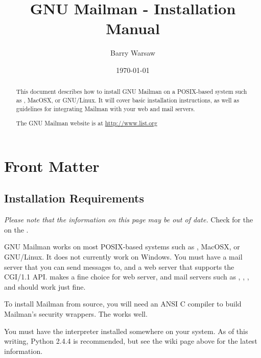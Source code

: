 \documentclass{howto}
\title{GNU Mailman - Installation Manual}
\author{Barry Warsaw}
\date{\today}
\begin{document}
\maketitle

%
\ifhtml
\chapter*{Front Matter\label{front}}
\fi

\begin{abstract}
\noindent
This document describes how to install GNU Mailman on a POSIX-based system
such as \UNIX{}, MacOSX, or GNU/Linux.  It will cover basic installation
instructions, as well as guidelines for integrating Mailman with your web and
mail servers.

\noindent
The GNU Mailman website is at \url{http://www.list.org}
\end{abstract}

%
\tableofcontents


\section{Installation Requirements}

\emph{Please note that the information on this page may be out of date.}
Check for the
 on the
.

GNU Mailman works on most POSIX-based systems such as \UNIX{}, MacOSX, or
GNU/Linux.  It does not currently work on Windows.  You must have a mail
server that you can send messages to, and a web server that supports the
CGI/1.1 API.   makes a fine choice for
web server, and mail servers such as
,
,
, and
 should
work just fine.

To install Mailman from source, you will need an ANSI C compiler to build
Mailman's security wrappers.  The
 works well.

You must have the  interpreter installed
somewhere on your system.  As of this writing, Python 2.4.4 is recommended,
but see the wiki page above for the latest information.
\end{document}
